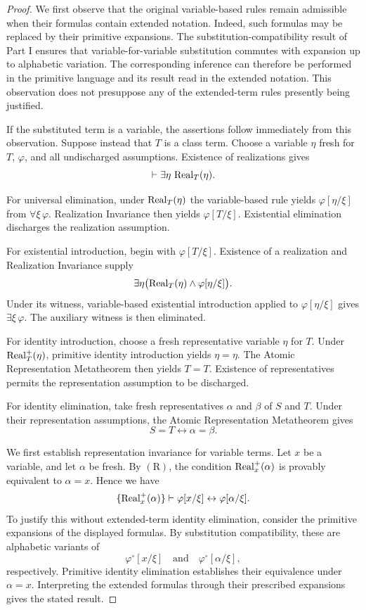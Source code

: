 \begin{proof}
We first observe that the original variable-based rules
remain admissible when their formulas contain extended
notation. Indeed, such formulas may be replaced by their
primitive expansions. The substitution-compatibility result
of Part I ensures that variable-for-variable substitution
commutes with expansion up to alphabetic variation. The
corresponding inference can therefore be performed in the
primitive language and its result read in the extended
notation. This observation does not presuppose any of the
extended-term rules presently being justified.

If the substituted term is a variable, the assertions
follow immediately from this observation. Suppose instead
that \(T\) is a class term. Choose a variable \(\eta\)
fresh for \(T\), \(\varphi\), and all undischarged
assumptions. Existence of realizations gives
\[
\vdash\exists\eta\,\operatorname{Real}_T(\eta).
\]

For universal elimination, under \(\operatorname{Real}_T(\eta)\)
the variable-based rule yields \(\varphi[\eta/\xi]\)
from \(\forall\xi\,\varphi\). Realization Invariance
then yields \(\varphi[T/\xi]\). Existential elimination
discharges the realization assumption.

For existential introduction, begin with
\(\varphi[T/\xi]\). Existence of a realization and
Realization Invariance supply
\[
\exists\eta\bigl(
\operatorname{Real}_T(\eta)\land\varphi[\eta/\xi]
\bigr).
\]
Under its witness, variable-based existential introduction
applied to \(\varphi[\eta/\xi]\) gives
\(\exists\xi\,\varphi\). The auxiliary witness is
then eliminated.

For identity introduction, choose a fresh representative
variable \(\eta\) for \(T\). Under
\(\operatorname{Real}^+_T(\eta)\), primitive identity
introduction yields \(\eta=\eta\). The Atomic
Representation Metatheorem then yields \(T=T\).
Existence of representatives permits the representation
assumption to be discharged.

For identity elimination, take fresh representatives
\(\alpha\) and \(\beta\) of \(S\) and \(T\).
Under their representation assumptions, the Atomic
Representation Metatheorem gives
\[
S=T\leftrightarrow\alpha=\beta.
\]

We first establish representation invariance for variable
terms. Let \(x\) be a variable, and let \(\alpha\)
be fresh. By \((\mathrm{R})\), the condition
\(\operatorname{Real}_x^+(\alpha)\) is provably equivalent to
\(\alpha=x\). Hence we have
\[
\{\operatorname{Real}^+_x(\alpha)\}
\vdash
\varphi[x/\xi]\leftrightarrow\varphi[\alpha/\xi].
\]
To justify this without extended-term identity elimination,
consider the primitive expansions of the displayed formulas.
By substitution compatibility, these are alphabetic variants
of
\[
\varphi^\circ[x/\xi]
\quad\text{and}\quad
\varphi^\circ[\alpha/\xi],
\]
respectively. Primitive identity elimination establishes
their equivalence under \(\alpha=x.\) Interpreting the
extended formulas through their prescribed expansions
gives the stated result.


\end{proof}
